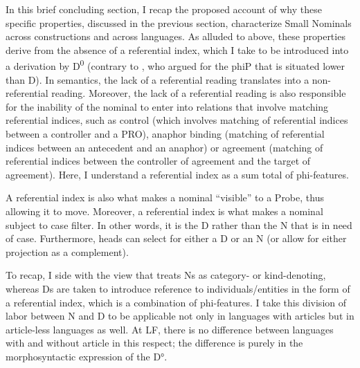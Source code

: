 \documentclass[output=paper]{langsci/langscibook}
\begin{document}
In this brief concluding section, I recap the proposed account of 
why these specific properties, discussed in the previous section, characterize Small Nominals across constructions and across languages. 
As alluded to above, these properties derive from the absence of a referential index, 
which I take to be introduced into a derivation by D\textsuperscript{0} (contrary to \citealt{DechaineWiltschko2002}, 
who argued for the phiP that is situated lower than D). 
In semantics, the lack of a referential reading translates into a non-referential reading. 
Moreover, the lack of a referential reading is also responsible for the inability of the nominal 
to enter into relations that involve matching referential indices, such as control (which involves matching of referential indices between a controller and a PRO), 
anaphor binding (matching of referential indices between an antecedent and an anaphor) 
or agreement (matching of referential indices between the controller of agreement and the target of agreement). 
Here, I understand a referential index as a sum total of phi-features. 

A referential index is also what makes a nominal “visible” to a Probe, thus allowing it to move. 
Moreover, a referential index is what makes a nominal subject to case filter. 
In other words, it is the D rather than the N that is in need of case. 
Furthermore, heads can select for either a D or an N (or allow for either projection as a complement). 

To recap, I side with the view that treats Ns as category- or kind-denoting, 
whereas Ds are taken to introduce reference to individuals/entities in the form of a referential index, 
which is a combination of phi-features. 
I take this division of labor between N and D to be applicable not only in languages with articles but in article-less languages as well. 
At LF, there is no difference between languages with and without article in this respect; 
the difference is purely in the morphosyntactic expression of the D°.

{\sloppy\printbibliography[heading=subbibliography,notkeyword=this]}
\end{document}
